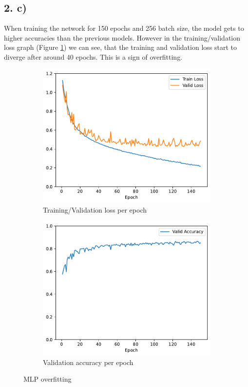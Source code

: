 \documentclass[11pt]{article}
\begin{document}
\subsection{2. c)}
When training the network for 150 epochs and 256 batch size, the model gets to higher accuracies than the previous models.
However in the training/validation loss graph (Figure \ref{fig:MLP_overfitting}) we can see, that the training and validation loss start to diverge after around 40 epochs.
This is a sign of overfitting.
\begin{figure}[h!]
\centering
\begin{subfigure}{.5\textwidth}
  \centering
  \includegraphics[width=.9\linewidth]{plots/mlp-training-loss-batch-256-lr-0.1-epochs-150-hidden-200-dropout-0.0-l2-0.0-layers-2-act-relu-opt-sgd.pdf}
  \caption{Training/Validation loss per epoch}
\end{subfigure}%
\begin{subfigure}{.5\textwidth}
  \centering
  \includegraphics[width=.9\linewidth]{plots/mlp-validation-accuracy-batch-256-lr-0.1-epochs-150-hidden-200-dropout-0.0-l2-0.0-layers-2-act-relu-opt-sgd}
  \caption{Validation accuracy per epoch}
\end{subfigure}
\caption{MLP overfitting}
\label{fig:MLP_overfitting}
\end{figure}
\end{document}
